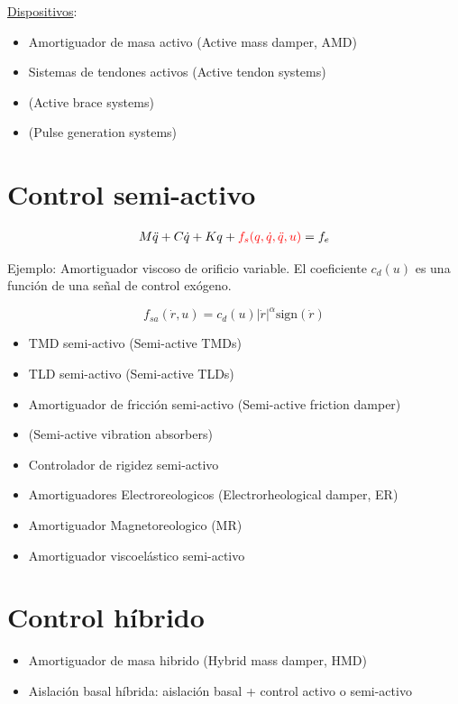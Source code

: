 \underline{Dispositivos}:
\begin{itemize}
    \item Amortiguador de masa activo (Active mass damper, AMD)
    \item Sistemas de tendones activos (Active tendon systems)
    \item (Active brace systems)
    \item (Pulse generation systems)
\end{itemize}

\section{Control semi-activo}

\begin{align}
    {M}{\ddot{q}} + {C}{\dot{q}} + {K}{q} + \textcolor{red}{{f}_s(q,\dot{q},\ddot{q},u)} = {f}_e
\end{align}

Ejemplo: Amortiguador viscoso de orificio variable. El coeficiente $c_d(u)$ es una función de una señal de control exógeno.

\begin{equation}
    f_{sa}(\dot{r},u) = c_d(u) |\dot{r}|^\alpha \text{sign}(\dot{r})
\end{equation}

\begin{itemize}
    \item TMD semi-activo (Semi-active TMDs)
    \item TLD semi-activo (Semi-active TLDs)
    \item Amortiguador de fricción semi-activo (Semi-active friction damper)
    \item (Semi-active vibration absorbers)
    \item Controlador de rigidez semi-activo
    \item Amortiguadores Electroreologicos (Electrorheological damper, ER)
    \item Amortiguador Magnetoreologico (MR)
    \item Amortiguador viscoelástico semi-activo
\end{itemize}

\section{Control híbrido}

\begin{itemize}
    \item Amortiguador de masa hibrido (Hybrid mass damper, HMD)
    \item Aislación basal híbrida: aislación basal + control activo o semi-activo
\end{itemize}
